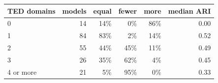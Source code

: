 \begin{tabular}{lrrrrr}
\toprule
TED domains & models & equal & fewer & more & median ARI \\
\midrule
0 & 14 & 14\% & 0\% & 86\% & 0.00 \\
1 & 84 & 83\% & 2\% & 14\% & 0.52 \\
2 & 55 & 44\% & 45\% & 11\% & 0.49 \\
3 & 26 & 35\% & 62\% & 4\% & 0.45 \\
4 or more & 21 & 5\% & 95\% & 0\% & 0.33 \\
\bottomrule
\end{tabular}
